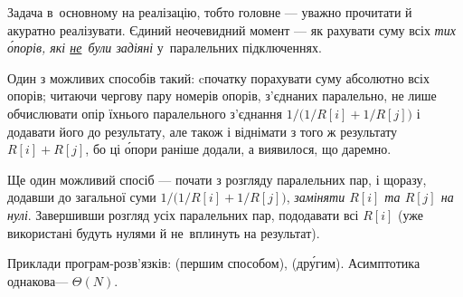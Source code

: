 \Tutorial	Задача в~основному на реалізацію, тобто головне --- уважно прочитати й акуратно реалізувати.
Єдиний неочевидний момент --- як рахувати суму всіх \emph{тих \'{о}порів, які \underline{не}~були задіяні} у~паралельних підключеннях.

Один з можливих способів такий: cпочатку порахувати суму абсолютно всіх опорів; читаючи чергову пару номерів опорів, з’єднаних паралельно, не лише обчислювати опір їхнього паралельного з’єднання $1/\bigl(1/R[i]+1/R[j]\bigr)$ і додавати його до результату, але також і віднімати з того ж результату $R[i]+R[j]$, бо ці \'{о}пори раніше додали, а виявилося, що даремно.

Ще один можливий спосіб --- почати з розгляду паралельних пар, і щоразу, додавши до загальної суми $1/\bigl(1/R[i]+1/R[j]\bigr)$, \emph{заміняти $R[i]$ та $R[j]$ на нулі}. Завершивши розгляд усіх паралельних пар, пододавати всі $R[i]$ (уже використані будуть нулями й не~вплинуть на результат).

Приклади програм-розв’язків:  (першим способом),  (др\'{у}гим). Асимптотика однакова\nolinebreak[3] --- $\Theta(N)$.
